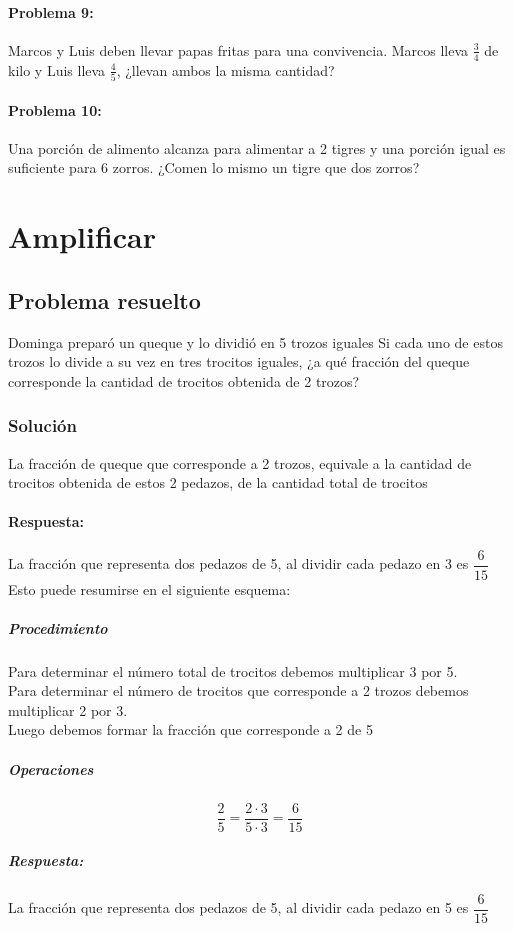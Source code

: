 \documentclass[10pt,twoside]{article}
\begin{document}
\paragraph*{Problema 9:}
Marcos y Luis deben llevar papas fritas para una convivencia. Marcos lleva $\frac{3}{4}$ de kilo y Luis lleva $\frac{4}{5}$, ¿llevan ambos la misma cantidad?
\paragraph*{Problema 10:}
Una porción de alimento alcanza para alimentar a 2 tigres y una porción igual es suficiente para 6 zorros. ¿Comen lo mismo un tigre que dos zorros?
\section*{Amplificar}
\subsection*{Problema resuelto}
Dominga preparó un queque y lo dividió en 5 trozos iguales Si cada uno de estos trozos lo divide a su vez en tres trocitos iguales, ¿a qué fracción del queque corresponde la cantidad de trocitos obtenida de 2 trozos?
\subsubsection*{Soluci\'{o}n}
La fracción de queque que corresponde a 2 trozos, equivale a la cantidad de trocitos obtenida de estos 2 pedazos, de la cantidad total de trocitos
\paragraph*{Respuesta:} 
La fracción que representa dos pedazos de 5, al dividir cada pedazo en 3 es $\dfrac{6}{15}$\\
Esto puede resumirse en el siguiente esquema:
\subparagraph*{Procedimiento}
Para determinar el número total de trocitos debemos multiplicar 3 por 5.\\
Para determinar el número de trocitos que corresponde a 2 trozos debemos multiplicar 2 por 3.\\
Luego debemos formar la fracción que corresponde a 2 de 5
\subparagraph*{Operaciones}
\[\dfrac{2}{5}=\dfrac{2\cdot 3}{5\cdot 3}=\dfrac{6}{15}\]
\subparagraph*{Respuesta:}
La fracción que representa dos pedazos de 5, al dividir cada pedazo en 5 es $\dfrac{6}{15}$
\end{document}

